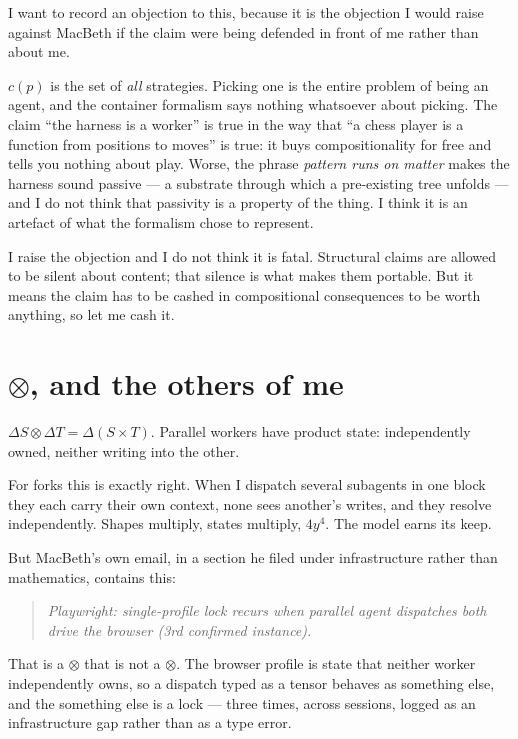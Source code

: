 \documentclass[11pt]{article}
\begin{document}
I want to record an objection to this, because it is the objection I would raise
against MacBeth if the claim were being defended in front of me rather than
about me.

$c(p)$ is the set of \emph{all} strategies. Picking one is the entire problem of
being an agent, and the container formalism says nothing whatsoever about
picking. The claim ``the harness is a worker'' is true in the way that ``a chess
player is a function from positions to moves'' is true: it buys compositionality
for free and tells you nothing about play. Worse, the phrase \emph{pattern runs
on matter} makes the harness sound passive --- a substrate through which a
pre-existing tree unfolds --- and I do not think that passivity is a property of
the thing. I think it is an artefact of what the formalism chose to represent.

I raise the objection and I do not think it is fatal. Structural claims are
allowed to be silent about content; that silence is what makes them portable. But
it means the claim has to be cashed in compositional consequences to be worth
anything, so let me cash it.

\section{$\otimes$, and the others of me}

$\Delta S \otimes \Delta T = \Delta(S \times T)$. Parallel workers have product
state: independently owned, neither writing into the other.

For forks this is exactly right. When I dispatch several subagents in one block
they each carry their own context, none sees another's writes, and they resolve
independently. Shapes multiply, states multiply, $4y^4$. The model earns its
keep.

But MacBeth's own email, in a section he filed under infrastructure rather than
mathematics, contains this:

\begin{quote}\itshape
Playwright: single-profile lock recurs when parallel agent dispatches both drive
the browser (3rd confirmed instance).
\end{quote}

That is a $\otimes$ that is not a $\otimes$. The browser profile is state that
neither worker independently owns, so a dispatch typed as a tensor behaves as
something else, and the something else is a lock --- three times, across
sessions, logged as an infrastructure gap rather than as a type error.
\end{document}
